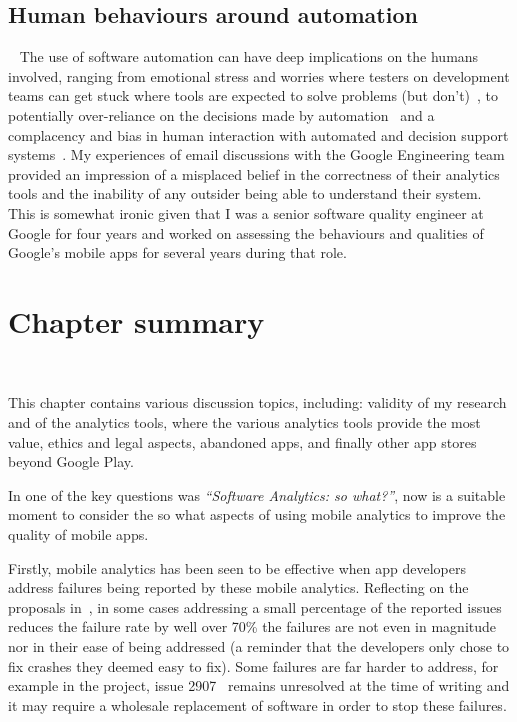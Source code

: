 \subsection{Human behaviours around automation}~\label{discussion-human-behaviours-around-automation-topic}
The use of software automation can have deep implications on the humans involved, ranging from emotional stress and worries where testers on development teams can get stuck where tools are expected to solve problems (but don't)~\cite{evans2020stuck}, to potentially over-reliance on the decisions made by automation~\cite{cummings2004automation} and a complacency and bias in human interaction with automated and decision support systems~\cite{parasuraman_complacency_and_bias_in_human_use_of_automation}. 
My experiences of email discussions with the Google Engineering team provided an impression of a misplaced belief in the correctness of their analytics tools and the inability of any outsider being able to understand their system. %
This is somewhat ironic given that I was a senior software quality engineer at Google for four years and worked on assessing the behaviours and qualities of Google's mobile apps for several years during that role.



\section{Chapter summary}~\label{discussion-chapter-summary-section}


This chapter contains various discussion topics, including: validity of my research and of the analytics tools, where the various analytics tools provide the most value, ethics and legal aspects, abandoned apps, and finally other app stores beyond Google Play.

In  one of the key questions was \emph{``Software Analytics: so what?''}, now is a suitable moment to consider the so what aspects of using mobile analytics to improve the quality of mobile apps. 

Firstly, mobile analytics has been seen to be effective when app developers address failures being reported by these mobile analytics. Reflecting on the proposals in~, in some cases addressing a small percentage of the reported issues reduces the failure rate by well over 70\% the failures are not even in magnitude nor in their ease of being addressed (a reminder that the  developers only chose to fix crashes they deemed easy to fix). Some failures are far harder to address, for example in the  project, issue 2907~ remains unresolved at the time of writing and it may require a wholesale replacement of software in order to stop these failures.


